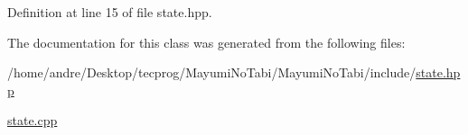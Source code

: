 Definition at line 15 of file state.\-hpp.



The documentation for this class was generated from the following files\-:\begin{DoxyCompactItemize}
\item 
/home/andre/\-Desktop/tecprog/\-Mayumi\-No\-Tabi/\-Mayumi\-No\-Tabi/include/\hyperlink{state_8hpp}{state.\-hpp}\item 
\hyperlink{state_8cpp}{state.\-cpp}\end{DoxyCompactItemize}
